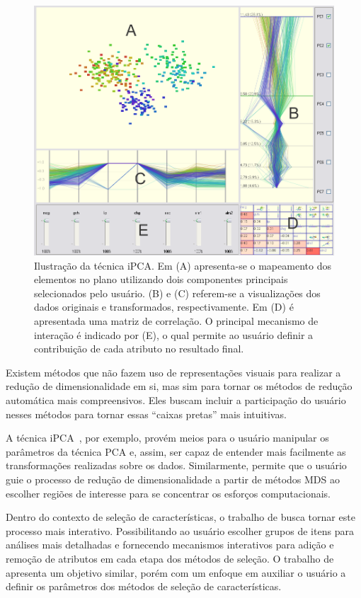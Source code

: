 \begin{figure}[h!]
    \centering
    \includegraphics[width=14cm]{images/ipca.png}
    \caption[iPCA]{Ilustração da técnica iPCA. Em (A)
    apresenta-se o mapeamento dos elementos no plano
utilizando dois componentes principais selecionados pelo
usuário. (B) e (C) referem-se a visualizações dos dados
originais e transformados, respectivamente. Em (D) é
apresentada uma matriz de correlação. O principal mecanismo
de interação é indicado por (E), o qual permite ao usuário
definir a contribuição de cada atributo no resultado final.}
    \label{fig:ipca}
\end{figure}

Existem métodos que não fazem uso de representações
visuais para realizar a redução de dimensionalidade em si,
mas sim para tornar os métodos de redução automática mais
compreensivos. Eles buscam incluir a participação do usuário
nesses métodos para tornar essas ``caixas pretas'' mais
intuitivas. 

A técnica iPCA~\cite{Jeong2009}, por exemplo, provém meios
para o usuário manipular os parâmetros da técnica PCA e,
assim, ser capaz de entender mais facilmente as
transformações realizadas sobre os dados. Similarmente,
\cite{Williams2004} permite que o usuário guie o processo de
redução de dimensionalidade a partir de métodos MDS ao
escolher regiões de interesse para se concentrar os esforços
computacionais.

Dentro do contexto de seleção de características, o trabalho
de \cite{Dy2000} busca tornar este processo mais interativo.
Possibilitando ao usuário escolher grupos de itens para
análises mais detalhadas e fornecendo mecanismos interativos
para adição e remoção de atributos em cada etapa dos métodos
de seleção. O trabalho de \cite{Brandoli2010} apresenta um
objetivo similar, porém com um enfoque em auxiliar o
usuário a definir os parâmetros dos métodos de seleção de
características.

